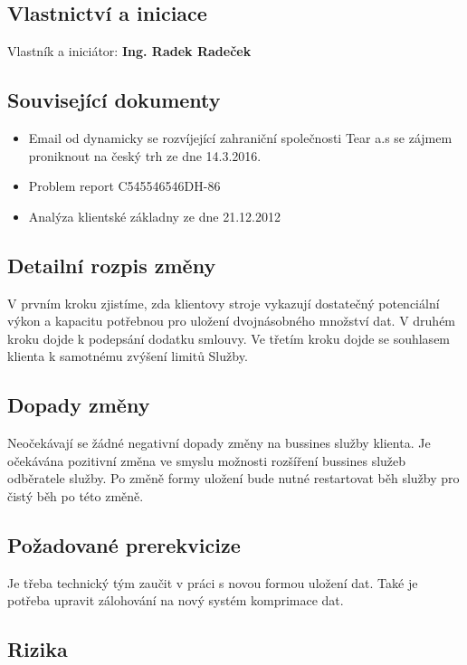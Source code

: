 \documentclass[11pt, a4paper, titlepage]{article}
\begin{document}
	\subsection{Vlastnictví a iniciace}

	Vlastník a iniciátor: \textbf{Ing. Radek Radeček}

	\subsection{Související dokumenty}
	\begin{itemize}
		\item Email od dynamicky se rozvíjející zahraniční společnosti Tear a.s se zájmem proniknout na český trh ze dne 14.3.2016.
		\item Problem report C545546546DH-86
		\item Analýza klientské základny ze dne 21.12.2012
	\end{itemize}

	\subsection{Detailní rozpis změny}

	V prvním kroku zjistíme, zda klientovy stroje vykazují dostatečný potenciální výkon a kapacitu potřebnou pro uložení dvojnásobného množství dat. V druhém kroku dojde k podepsání dodatku smlouvy. Ve třetím kroku dojde se souhlasem klienta k samotnému zvýšení limitů Služby.

	\subsection{Dopady změny}

	Neočekávají se žádné negativní dopady změny na bussines služby klienta. Je očekávána pozitivní změna ve smyslu možnosti rozšíření bussines služeb odběratele služby. Po změně formy uložení bude nutné restartovat běh služby pro čistý běh po této změně.

	\subsection{Požadované prerekvicize}

	Je třeba technický tým zaučit v práci s novou formou uložení dat. Také je potřeba upravit zálohování na nový systém komprimace dat. 

	\subsection{Rizika}
\end{document}
